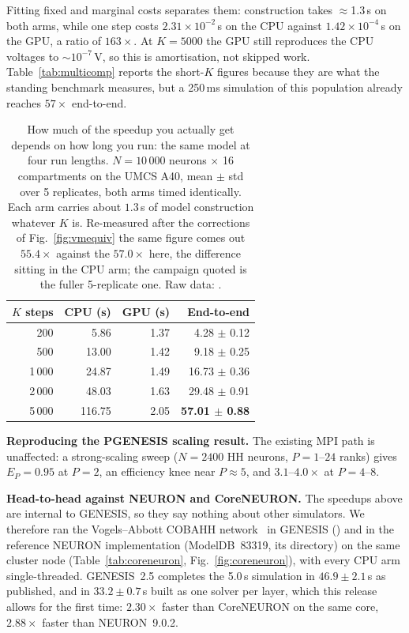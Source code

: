 \documentclass[preprint,12pt, a4paper]{elsarticle}
\begin{document}
\begin{enumerate}
Fitting fixed and marginal costs separates them: construction takes $\approx$1.3\,s on both arms, while one step costs $2.31\times10^{-2}$\,s on the CPU against $1.42\times10^{-4}$\,s on the GPU, a ratio of $163\times$. At $K=5000$ the GPU still reproduces the CPU voltages to $\sim$$10^{-7}$\,V, so this is amortisation, not skipped work. Table~\ref{tab:multicomp} reports the short-$K$ figures because they are what the standing benchmark measures, but a 250\,ms simulation of this population already reaches $57\times$ end-to-end.

\begin{table}[!h]
\centering
\small
\begin{tabular}{|r|r|r|r|}
\hline
\textbf{$K$ steps} & \textbf{CPU (s)} & \textbf{GPU (s)} & \textbf{End-to-end} \\
\hline
200  & 5.86  & 1.37 & 4.28 $\pm$ 0.12 \\
\hline
500  & 13.00 & 1.42 & 9.18 $\pm$ 0.25 \\
\hline
1\,000 & 24.87 & 1.49 & 16.73 $\pm$ 0.36 \\
\hline
2\,000 & 48.03 & 1.63 & 29.48 $\pm$ 0.91 \\
\hline
5\,000 & 116.75 & 2.05 & \textbf{57.01 $\pm$ 0.88} \\
\hline
\end{tabular}
\caption{How much of the speedup you actually get depends on how long you run: the same model at four run lengths. $N=10\,000$ neurons $\times$ 16 compartments on the UMCS A40, mean $\pm$ std over 5 replicates, both arms timed identically. Each arm carries about $1.3$\,s of model construction whatever $K$ is. Re-measured after the corrections of Fig.~\ref{fig:vmequiv} the same figure comes out $55.4\times$ against the $57.0\times$ here, the difference sitting in the CPU arm; the campaign quoted is the fuller 5-replicate one. Raw data: \protect{}.}
\label{tab:mcksweep}
\end{table}



\textbf{Reproducing the PGENESIS scaling result.} The existing MPI path is unaffected: a strong-scaling sweep ($N=2400$ HH neurons, $P=1$--$24$ ranks) gives $E_P=0.95$ at $P=2$, an efficiency knee near $P\approx5$, and $3.1$--$4.0\times$ at $P=4$--$8$.

\textbf{Head-to-head against NEURON and CoreNEURON.} The speedups above are internal to GENESIS, so they say nothing about other simulators. We therefore ran the Vogels--Abbott COBAHH network~\cite{vogels2005signal,brette2007simulation} in GENESIS () and in the reference NEURON implementation (ModelDB~83319, its  directory) on the same cluster node (Table~\ref{tab:coreneuron}, Fig.~\ref{fig:coreneuron}), with every CPU arm single-threaded. GENESIS~2.5 completes the 5.0\,s simulation in $46.9\pm2.1$\,s as published, and in $33.2\pm0.7$\,s built as one solver per layer, which this release allows for the first time: $2.30\times$ faster than CoreNEURON on the same core, $2.88\times$ faster than NEURON~9.0.2. 


\end{enumerate}
\end{document}
